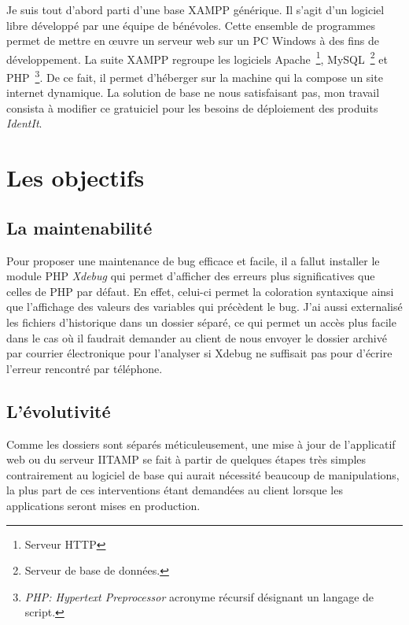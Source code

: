 Je suis tout d'abord parti d'une base XAMPP générique. Il s'agit d'un
logiciel libre développé par une équipe de bénévoles. Cette ensemble de
programmes permet de mettre en \oe{}uvre un serveur web sur un PC
Windows à des fins de développement. La suite XAMPP regroupe les
logiciels Apache\, \footnote{Serveur HTTP}, MySQL\, \footnote{Serveur de
base de données.} et PHP\, \footnote{\emph{PHP: Hypertext Preprocessor}
acronyme récursif désignant un langage de script.}. De ce fait, il
permet d'héberger sur la machine qui la compose un site internet
dynamique. La solution de base ne nous satisfaisant pas, mon travail
consista à modifier ce gratuiciel pour les besoins de déploiement des
produits \emph{IdentIt}.

\section{Les objectifs} %
\label{sec:Les objectifs}

\subsection{La maintenabilité} %
\label{sub:La maintenabilité}

Pour proposer une maintenance de bug efficace et facile, il a fallut
installer le module PHP \emph{Xdebug} qui permet d'afficher des erreurs
plus significatives que celles de PHP par défaut. En effet, celui-ci
permet la coloration syntaxique ainsi que l'affichage des valeurs des
variables qui précèdent le bug. J'ai aussi externalisé les fichiers
d'historique dans un dossier séparé, ce qui permet un accès plus facile
dans le cas où il faudrait demander au client de nous envoyer le dossier
archivé par courrier électronique pour l'analyser si Xdebug ne suffisait
pas pour d'écrire l'erreur rencontré par téléphone.

\subsection{L'évolutivité} %
\label{sub:L'évolutivité}

Comme les dossiers sont séparés méticuleusement, une mise à jour de
l'applicatif web ou du serveur IITAMP se fait à partir de quelques
étapes très simples contrairement au logiciel de base qui aurait
nécessité beaucoup de manipulations, la plus part de ces interventions
étant demandées au client lorsque les applications seront mises en
production.

